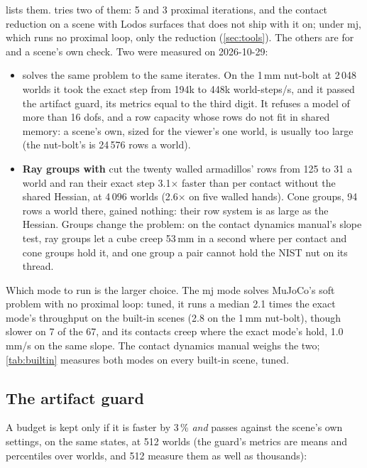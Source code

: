  lists them.  tries two of them: 5 and 3 proximal iterations, and the contact reduction on a scene with Lodos surfaces that does not ship with it on; under mj, which runs no proximal loop, only the reduction (\cref{sec:tools}). The others are for  and a scene's own check. Two were measured on 2026-10-29:

\begin{itemize}
\item \textbf{} solves the same problem to the same iterates. On the 1\,mm nut-bolt at 2\,048 worlds it took the exact step from 194k to 448k world-steps/s, and it passed the artifact guard, its metrics equal to the third digit. It refuses a model of more than 16 dofs, and a row capacity whose rows do not fit in shared memory: a scene's own, sized for the viewer's one world, is usually too large (the nut-bolt's is 24\,576 rows a world).
\item \textbf{Ray groups with } cut the twenty walled armadillos' rows from 125 to 31 a world and ran their exact step 3.1$\times$ faster than per contact without the shared Hessian, at 4\,096 worlds (2.6$\times$ on five walled hands). Cone groups, 94 rows a world there, gained nothing: their row system is as large as the Hessian. Groups change the problem: on the contact dynamics manual's slope test, ray groups let a cube creep 53\,mm in a second where per contact and cone groups hold it, and one group a pair cannot hold the NIST nut on its thread.
\end{itemize}

Which mode to run is the larger choice. The mj mode solves MuJoCo's soft problem with no proximal loop: tuned, it runs a median 2.1 times the exact mode's throughput on the built-in scenes (2.8 on the 1\,mm nut-bolt), though slower on 7 of the 67, and its contacts creep where the exact mode's hold, 1.0\,mm/s on the same slope. The contact dynamics manual weighs the two; \cref{tab:builtin} measures both modes on every built-in scene, tuned.

\subsection{The artifact guard}\label{sec:guard}

A budget is kept only if it is faster by 3\,\% \emph{and}  passes against the scene's own settings, on the same states, at 512 worlds (the guard's metrics are means and percentiles over worlds, and 512 measure them as well as thousands):

